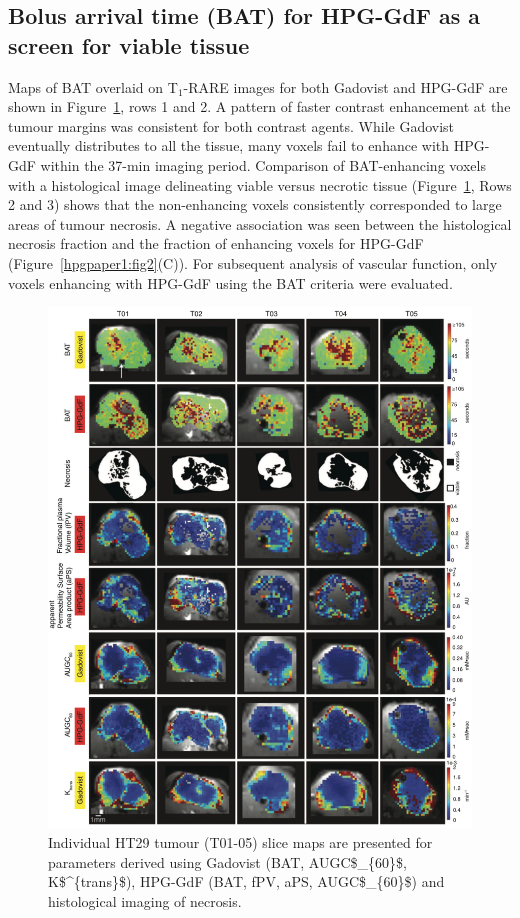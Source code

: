 \subsection{Bolus arrival time (BAT) for \acs{HPG-GdF} as a screen for viable tissue}

Maps of \acs{BAT} overlaid on T$_1$-RARE images for both Gadovist and \acs{HPG-GdF} are shown in Figure~\ref{hpgpaper1:fig4}, rows 1 and 2.
A pattern of faster contrast enhancement at the tumour margins was consistent for both contrast agents.
While Gadovist eventually distributes to all the tissue, many voxels fail to enhance with \acs{HPG-GdF} within the 37-min imaging period.
Comparison of \acs{BAT}-enhancing voxels with a histological image delineating viable versus necrotic tissue (Figure~\ref{hpgpaper1:fig4}, Rows 2 and 3) shows that the non-enhancing voxels consistently corresponded to large areas of tumour necrosis.
A negative association was seen between the histological necrosis fraction and the fraction of enhancing voxels for \acs{HPG-GdF} (Figure~\ref{hpgpaper1:fig2}(C)).
For subsequent analysis of vascular function, only voxels enhancing with \acs{HPG-GdF} using the \acs{BAT} criteria were evaluated.

\begin{figure}[htbp]
 \includegraphics[width=\textwidth]{hpg/hpg-paper1-images/hpg_fig4-ht29.png}
 \caption{Individual HT29 tumour (T01-05) slice maps are presented for parameters derived using Gadovist (\acs{BAT}, \acs{AUGC$_{60}$}, \acs{K$^{trans}$}), \acs{HPG-GdF} (\acs{BAT}, \acs{fPV}, \acs{aPS}, \acs{AUGC$_{60}$}) and histological imaging of necrosis.}
 \label{hpgpaper1:fig4}
\end{figure}

